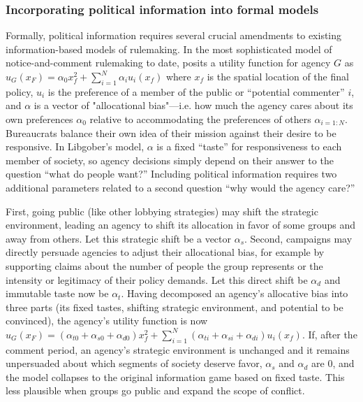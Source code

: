 \subsubsection{Incorporating political information into formal models}

Formally, political information requires several crucial amendments to existing information-based models of rulemaking. In the most sophisticated model of notice-and-comment rulemaking to date, \citet{Libgober2018} posits a utility function for agency $G$ as $u_G(x_F) = \alpha_0 x_f^2 + \sum_{i=1}^N \alpha_i u_i (x_f)$ where $x_f$ is the spatial location of the final policy, $u_i$ is the preference of a member of the public or ``potential commenter'' $i$, and $\alpha$ is a vector of "allocational bias"---i.e. how much the agency cares about its own preferences $\alpha_0$ relative to accommodating the preferences of others $\alpha_{i=1:N}$. Bureaucrats balance their own idea of their mission against their desire to be responsive. In Libgober's model, $\alpha$ is a fixed ``taste'' for responsiveness to each member of society, so agency decisions simply depend on their answer to the question ``what do people want?'' Including political information requires two additional parameters related to a second question ``why would the agency care?''

First, going public (like other lobbying strategies) may shift the strategic environment, leading an agency to shift its allocation in favor of some groups and away from others. Let this strategic shift be a vector $\alpha_s$. Second, campaigns may directly persuade agencies to adjust their allocational bias, for example by supporting claims about the number of people the group represents or the intensity or legitimacy of their policy demands. Let this direct shift be $\alpha_d$ and immutable taste now be $\alpha_t$. Having decomposed an agency's allocative bias into three parts (its fixed tastes, shifting strategic environment, and potential to be convinced), the agency's utility function is now  $u_G(x_F) =  (\alpha_{t0} + \alpha_{s0} + \alpha_{d0}) x_f^2 + \sum_{i=1}^N (\alpha_{ti} + \alpha_{si} + \alpha_{di}) u_i (x_f)$. If, after the comment period, an agency's strategic environment is unchanged and it remains unpersuaded about which segments of society deserve favor, $\alpha_s$ and $\alpha_d$ are 0, and the model collapses to the original information game based on fixed taste. This less plausible when groups go public and expand the scope of conflict. 


